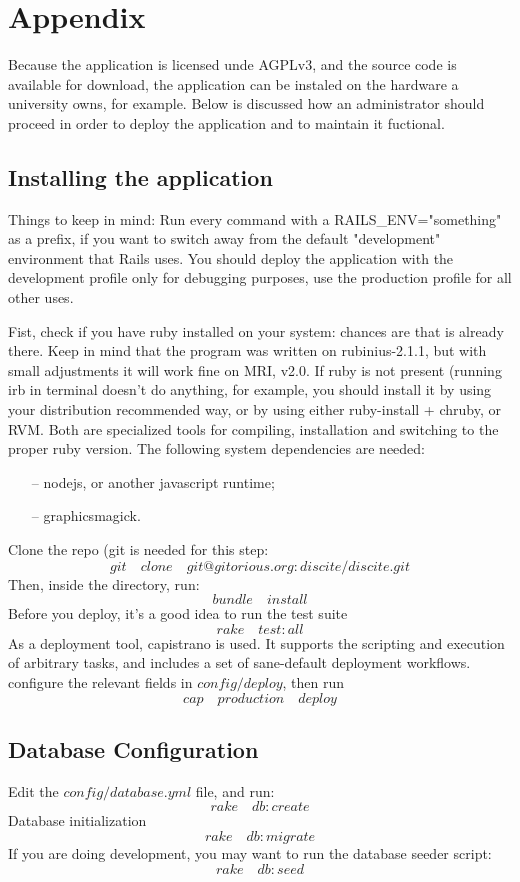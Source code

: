 \section*{Appendix}
Because the application is licensed unde AGPLv3, and the source code is available
for download, the application can be instaled on the hardware a university owns,
for example. Below is discussed how an administrator should proceed in order to
deploy the application and to maintain it fuctional.
\subsection{Installing the application}
Things to keep in mind:
Run every command with a RAILS\_ENV="something" as a prefix, if you want to
switch away from the default "development" environment that Rails uses. You should
deploy the application with the development profile only for debugging purposes,
use the production profile for all other uses.

Fist, check if you have ruby installed on your system: chances are that is already
there. Keep in mind that the program was written on rubinius-2.1.1, but with
small adjustments it will work fine on MRI, v2.0.
If ruby is not present (running irb in terminal doesn't do anything, for example,
you should install it by using your distribution recommended way, or by using
either ruby-install + chruby, or RVM. Both are specialized tools for compiling, installation
and switching to the proper ruby version.
The following system dependencies are needed:
\begin{enumerate}[topsep=5pt, partopsep=0pt,itemsep=3pt,parsep=1pt]
    \item[--] nodejs, or another javascript runtime;
    \item[--] graphicsmagick.
\end{enumerate}
Clone the repo (git is needed for this step:
\[ git \quad  clone \quad git@gitorious.org:discite/discite.git\]
Then, inside the directory, run:
\[ bundle \quad install \]
Before you deploy, it's a good idea to run the test suite
\[ rake \quad test:all\]
As a deployment tool, capistrano is used.
It supports the scripting and execution of arbitrary tasks, and includes a set of sane-default deployment workflows.
configure the relevant fields in \(config/deploy\), then run
\[ cap \quad production \quad deploy\]
\subsection{Database Configuration}
Edit the \(config/database.yml\) file, and run:
\[rake \quad db:create\]
Database initialization
\[rake \quad db:migrate\]
If you are doing development, you may want to run the database seeder script:
\[rake \quad  db:seed\]
